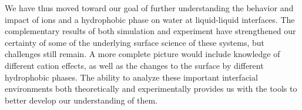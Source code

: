 We have thus moved toward our goal of further understanding the behavior and impact of ions and a hydrophobic phase on water at liquid-liquid interfaces. The complementary results of both simulation and experiment have strengthened our certainty of some of the underlying surface science of these systems, but challenges still remain. A more complete picture would include knowledge of different cation effects, as well as the changes to the surface by different hydrophobic phases. The ability to analyze these important interfacial environments both theoretically and experimentally provides us with the tools to better develop our understanding of them.


